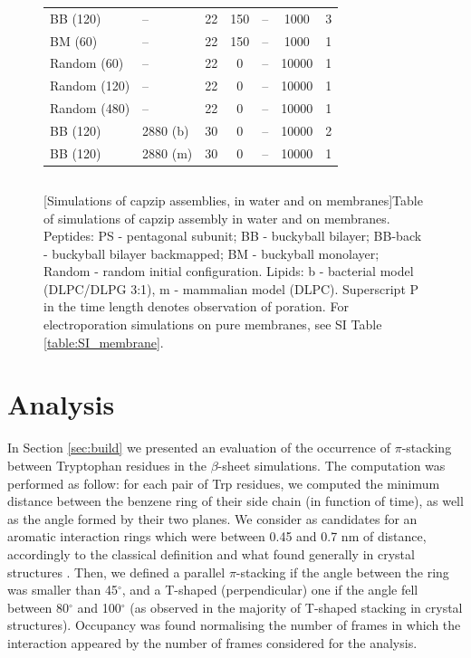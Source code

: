 \begin{figure}[p!]
\begin{tabular}{llccccc}
 BB (120) & -- & 22 & 150 & -- & 1000 & 3 \\
 BM (60) & -- & 22 & 150 & -- & 1000 & 1 \\
 Random (60) & -- & 22 & 0 & -- & 10000 & 1 \\
 Random (120) & -- & 22 & 0 & -- & 10000 & 1 \\
 Random (480) & -- & 22 & 0 & -- & 10000 & 1 \\
 BB (120) & 2880 (b) & 30 & 0 & -- & 10000 & 2 \\
 BB (120) & 2880 (m) & 30 & 0 & -- & 10000 & 1 \\
 \hline
 \end{tabular}
 \begin{tabular}{lcccccc}
 \hline
 \hline
\end{tabular}
[Simulations of capzip assemblies, in water and on membranes]{Table of simulations of capzip assembly in water and on membranes.
%
Peptides: PS - pentagonal subunit; BB - buckyball bilayer; BB-back - buckyball bilayer backmapped; BM - buckyball monolayer; Random - random initial configuration.
%
Lipids: b - bacterial model (DLPC/DLPG 3:1), m - mammalian model (DLPC).
%
%
Superscript P in the time length denotes observation of poration.
%
For electroporation simulations on pure membranes, see SI Table \ref{table:SI_membrane}.}
\label{table:sim_all}
\end{figure}

\section{Analysis} \label{sec:analysis}

In Section \ref{sec:build} we presented an evaluation of the occurrence of $\pi$-stacking between Tryptophan residues in the $\beta$-sheet simulations. The computation was performed as follow: for each pair of Trp residues, we computed the minimum distance between the benzene ring of their side chain (in function of time), as well as the angle formed by their two planes. We consider as candidates for an aromatic interaction rings which were between 0.45 and 0.7 nm of distance, accordingly to the classical definition \cite{Burley1986} and what found generally in crystal structures \cite{Anjana2012}. 
%
Then, we defined a parallel $\pi$-stacking if the angle between the ring was smaller than 45$^{\circ}$, and a T-shaped (perpendicular) one if the angle fell between 80$^{\circ}$ and 100$^{\circ}$ (as observed in the majority of T-shaped stacking in crystal structures). Occupancy was found normalising the number of frames in which the interaction appeared by the number of frames considered for the analysis.    
    
